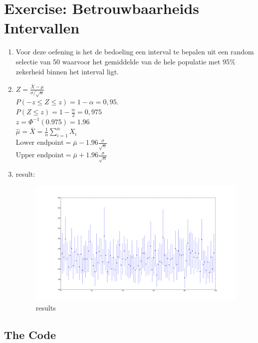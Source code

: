 \documentclass[pdftex,12pt,a4paper]{article}
\begin{document}
\section{Exercise: Betrouwbaarheids Intervallen}
    \begin{enumerate}
        \item
            Voor deze oefening is het de bedoeling een interval te bepalen uit een random selectie van 50 waarvoor het gemiddelde van de hele populatie met 95\% zekerheid binnen het interval ligt.
        \item

            $Z = \frac {\bar X-\mu}{\sigma/\sqrt{n}}$\\
            $P(-z\le Z\le z) = 1-\alpha = 0,95.$\\
            $P(Z \le z) = 1 - \frac{\alpha}2 = 0{,}975$\\
            $z = \Phi^{-1}(0.975) = 1.96$\\

            $\hat \mu=\bar X = \frac{1}{n}\sum_{i=1}^n X_i$\\
            $\text{Lower endpoint} = \bar\mu - 1.96 \frac{\sigma}{\sqrt{n}}$\\
            $\text{Upper endpoint} = \bar\mu + 1.96 \frac{\sigma}{\sqrt{n}}$
        \item
            result:
            \begin{figure}[H]
                \centering
                \includegraphics[width=\linewidth]{figure_1.png}
                \caption{results}
                \label{fig:results}
            \end{figure}
    \end{enumerate}
    \subsection{The Code}
    \inputminted{python}{Confidence.py}
    
\end{document}
